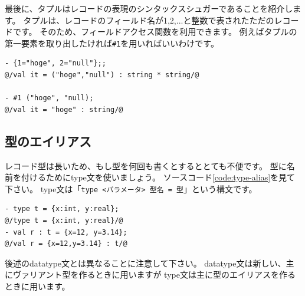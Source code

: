 \documentclass[11pt,a4paper]{article}
\begin{document}
最後に、タプルはレコードの表現のシンタックスシュガーであることを紹介します。
タプルは、レコードのフィールド名が1,2,...と整数で表されたただのレコードです。
そのため、フィールドアクセス関数を利用できます。
例えばタプルの第一要素を取り出したければ\lstinline{#1}を用いればいいわけです。

\begin{lstlisting}[caption=タプルはレコード,label=code:tuple-is-record]
- {1="hoge", 2="null"};;
@/val it = ("hoge","null") : string * string/@

- #1 ("hoge", "null);
@/val it = "hoge" : string/@
\end{lstlisting}

\subsection{型のエイリアス}

レコード型は長いため、もし型を何回も書くとするととても不便です。
型に名前を付けるためにtype文を使いましょう。
ソースコード\ref{code:type-alias}を見て下さい。
type文は「\lstinline{type <パラメータ> 型名 = 型}」という構文です。

\begin{lstlisting}[caption=型のエイリアス,label=code:type-alias]
- type t = {x:int, y:real};
@/type t = {x:int, y:real}/@
- val r : t = {x=12, y=3.14};
@/val r = {x=12,y=3.14} : t/@
\end{lstlisting}

後述のdatatype文とは異なることに注意して下さい。
datatype文は新しい、主にヴァリアント型を作るときに用いますが
type文は主に型のエイリアスを作るときに用います。
\end{document}
